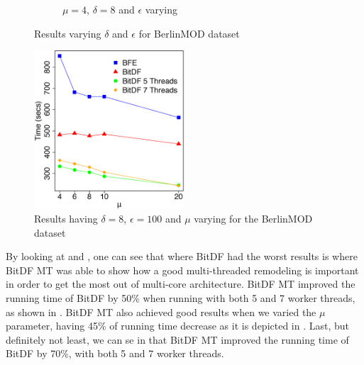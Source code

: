 {\begin{figure}[h!]
\begin{subfigure}[t]{0.49\textwidth}
        \caption{$\mu = 4$, $\delta = 8$ and $\epsilon$ varying}
        \label{fig:berlinmod_complete_vary_g}
    \end{subfigure}
    \caption{Results varying $\delta$ and $\epsilon$ for BerlinMOD dataset}
    \label{fig:berlinmod_complete_results}
\end{figure}

\begin{figure}[h!]
    \centering
    \includegraphics[width=0.5\textwidth]{images/BerlinMOD_complete_varying_n.eps}
    \caption{Results having $\delta = 8$, $\epsilon = 100$ and $\mu$ varying for the BerlinMOD dataset}
    \label{fig:berlinmod_complete_vary_n}
\end{figure}

By looking at  and , one can see that
where BitDF had the worst results is where BitDF MT was able to show how a good multi-threaded remodeling is important
in order to get the most out of multi-core architecture. BitDF MT improved the running time of BitDF by 50\% when
running with both 5 and 7 worker threads, as shown in . BitDF MT also achieved
good results when we varied the $\mu$ parameter, having 45\% of running time decrease as it is depicted in
. Last, but definitely not least, we can se in
 that BitDF MT improved the running time of BitDF by 70\%, with both 5 and 7
worker threads.

}
